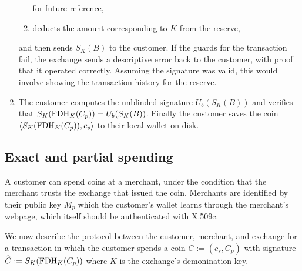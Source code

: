 \documentclass{llncs}
\begin{document}
\begin{enumerate}
\begin{enumerate}
            for future reference,
      \item deducts the amount corresponding to $K$ from the reserve,
    \end{enumerate}
    and then sends $S_K(B)$ to the customer.
    If the guards for the transaction fail, the exchange sends a descriptive
    error back to the customer, with proof that it operated correctly.
    Assuming the signature was valid, this would involve showing the transaction
    history for the reserve.
  \item The customer computes the unblinded signature $U_b(S_K(B))$ and
    verifies that $S_K(\textrm{FDH}_K(C_p)) = U_b(S_K(B))$.
    Finally the customer saves the coin $\langle S_K(\textrm{FDH}_K(C_p)), c_s \rangle$
    to their local wallet on disk.
\end{enumerate}


\subsection{Exact and partial spending}

A customer can spend coins at a merchant, under the condition that the
merchant trusts the exchange that issued the coin.
Merchants are identified by their public key $M_p$ which the
customer's wallet learns through the merchant's webpage, which itself
should be authenticated with X.509c.

We now describe the protocol between the customer, merchant, and exchange
for a transaction in which the customer spends a coin $C := (c_s, C_p)$
with signature $\widetilde{C} := S_K(\textrm{FDH}_K(C_p))$
 where $K$ is the exchange's demonination key.

\end{document}
